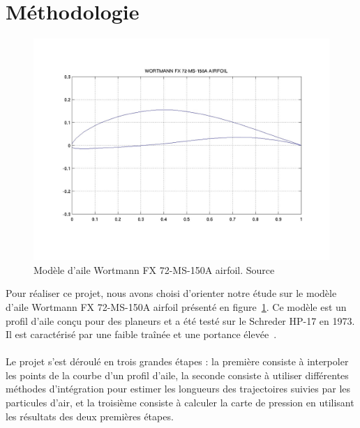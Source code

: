 \documentclass{article}
\begin{document}
\section{Méthodologie}
\begin{minipage}{0.4\textwidth}
  \begin{figure}[H]
    \centering
    \includegraphics[trim=100 100 100 100, clip, width=\textwidth]{fx72150a.jpg}
    \caption{Modèle d’aile Wortmann FX 72-MS-150A airfoil. Source~\cite{uiuc_fx72150a}}
    \label{fig:airfoil}
  \end{figure}
\end{minipage}
\hfill
\begin{minipage}{0.55\textwidth}
  Pour réaliser ce projet, nous avons choisi d'orienter notre étude sur le modèle d'aile Wortmann FX 72-MS-150A airfoil présenté en figure~\ref{fig:airfoil}. Ce modèle est un profil d’aile conçu pour des planeurs et a été testé sur le Schreder HP-17 en 1973. Il est caractérisé par une faible traînée et une portance élevée~\cite{WikipediaSchrederHP17}. \\ \\
  Le projet s’est déroulé en trois grandes étapes : la première consiste à interpoler les points de la courbe d’un profil d’aile, la seconde consiste à utiliser différentes méthodes d’intégration pour estimer les longueurs des trajectoires suivies par les particules d’air, et la troisième consiste à calculer la carte de pression en utilisant les résultats des deux premières étapes.
\end{minipage}
\end{document}
